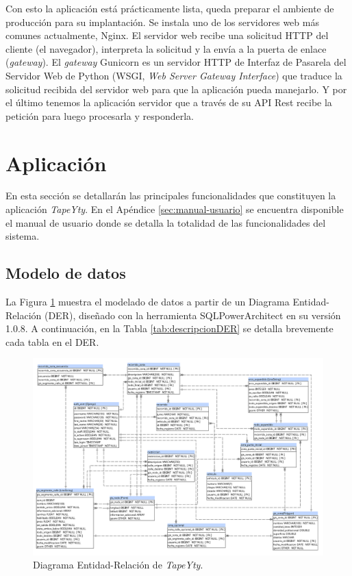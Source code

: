 Con esto la aplicación está prácticamente lista, queda preparar el ambiente de producción para su implantación. Se instala uno de los servidores web más comunes actualmente, Nginx. El servidor web recibe una solicitud HTTP del cliente (el navegador), interpreta la solicitud y la envía a la puerta de enlace (\textit{gateway}). El \textit{gateway} Gunicorn es un servidor HTTP de Interfaz de Pasarela del Servidor Web de Python (WSGI, \textit{Web Server Gateway Interface}) que traduce la solicitud recibida del servidor web para que la aplicación pueda manejarlo. Y por el último tenemos la aplicación servidor que a través de su API Rest recibe la petición para luego procesarla y responderla.

\section{Aplicación}

En esta sección se detallarán las principales funcionalidades que constituyen la aplicación \textit{TapeYty}. En el Apéndice \ref{sec:manual-usuario} se encuentra disponible el manual de usuario donde se detalla la totalidad de las funcionalidades del sistema.

\subsection{Modelo de datos}

La Figura \ref{fig:DERTapeYty} muestra el modelado de datos a partir de un Diagrama Entidad-Relación (DER), diseñado con la herramienta SQLPowerArchitect \citep{SQLArchitect} en su versión 1.0.8. A continuación, en la Tabla \ref{tab:descripcionDER} se detalla brevemente cada tabla en el DER.

\begin{landscape}
\begin{figure}[tbp]
\centerline{\includegraphics[height=\textheight]{20190716_DER.png}}
\caption{Diagrama Entidad-Relación de \textit{TapeYty}.}
\label{fig:DERTapeYty}
\end{figure}
\end{landscape}


